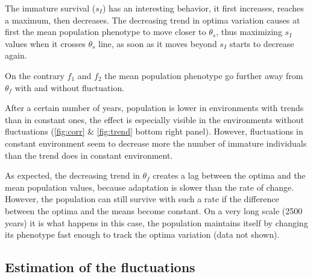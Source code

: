 The immature survival ($s_I$) has an interesting behavior, it first increases, reaches a maximum, then decreases. The decreasing trend in optima variation causes at first the mean population phenotype to move closer to $\theta_s$, thus maximizing $s_I$ values when it crosses $\theta_s$ line, as soon as it moves beyond $s_I$ starts to decrease again.

On the contrary $f_1$ and $f_2$ the mean population phenotype go further away from $\theta_f$ with and without fluctuation.

After a certain number of years, population is lower in environments with trends than in constant ones, the effect is especially visible in the environments without fluctuations (\autoref{fig:corr} \& \autoref{fig:trend} bottom right panel). However, fluctuations in constant environment seem to decrease more the number of immature individuals than the trend does in constant environment. 

As expected, the decreasing trend in $\theta_f$ creates a lag between the optima and the mean population values, because adaptation is slower than the rate of change. However, the population can still survive with such a rate if the difference between the optima and the means become constant. On a very long scale (2500 years) it is what happens in this case, the population maintains itself by changing its phenotype fast enough to track the optima variation (data not shown).

\clearpage

\subsection*{Estimation of the fluctuations}

